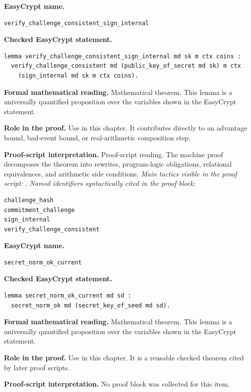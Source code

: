 \begin{formaltheorem}
\noindent\textbf{EasyCrypt name.}
\begin{lstlisting}[language=EasyCrypt,basicstyle=\ttfamily\scriptsize]
verify_challenge_consistent_sign_internal
\end{lstlisting}
\noindent\textbf{Checked EasyCrypt statement.}
\begin{lstlisting}[language=EasyCrypt,basicstyle=\ttfamily\scriptsize]
lemma verify_challenge_consistent_sign_internal md sk m ctx coins :
  verify_challenge_consistent md (public_key_of_secret md sk) m ctx
    (sign_internal md sk m ctx coins).
\end{lstlisting}
\noindent\textbf{Formal mathematical reading.}
Mathematical theorem. This lemma is a universally quantified proposition over the variables shown in the EasyCrypt statement.

\noindent\textbf{Role in the proof.}
Use in this chapter. It contributes directly to an advantage bound, bad-event bound, or real-arithmetic composition step.

\noindent\textbf{Proof-script interpretation.}
Proof-script reading. The machine proof decomposes the theorem into rewrites, program-logic obligations, relational equivalences, and arithmetic side conditions.
\emph{Main tactics visible in the proof script:} .
\emph{Named identifiers syntactically cited in the proof block:}
\begin{lstlisting}[language=EasyCrypt,basicstyle=\ttfamily\scriptsize]
challenge_hash
commitment_challenge
sign_internal
verify_challenge_consistent
\end{lstlisting}

\end{formaltheorem}

\begin{formaltheorem}
\noindent\textbf{EasyCrypt name.}
\begin{lstlisting}[language=EasyCrypt,basicstyle=\ttfamily\scriptsize]
secret_norm_ok_current
\end{lstlisting}
\noindent\textbf{Checked EasyCrypt statement.}
\begin{lstlisting}[language=EasyCrypt,basicstyle=\ttfamily\scriptsize]
lemma secret_norm_ok_current md sd :
  secret_norm_ok md (secret_key_of_seed md sd).
\end{lstlisting}
\noindent\textbf{Formal mathematical reading.}
Mathematical theorem. This lemma is a universally quantified proposition over the variables shown in the EasyCrypt statement.

\noindent\textbf{Role in the proof.}
Use in this chapter. It is a reusable checked theorem cited by later proof scripts.

\noindent\textbf{Proof-script interpretation.}
No proof block was collected for this item.

\end{formaltheorem}

